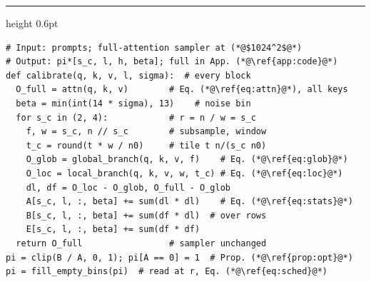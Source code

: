   \begin{minipage}[t]{0.48\linewidth}
    \hrule height 0.6pt\vspace{2pt}
    \label{alg:calib}
    \vspace{-4pt}
\begin{lstlisting}[style=scacode, emph={calibrate,attn,global_branch,local_branch,clip,fill_empty_bins}]
# Input: prompts; full-attention sampler at (*@$1024^2$@*)
# Output: pi*[s_c, l, h, beta]; full in App. (*@\ref{app:code}@*)
def calibrate(q, k, v, l, sigma):  # every block
  O_full = attn(q, k, v)        # Eq. (*@\ref{eq:attn}@*), all keys
  beta = min(int(14 * sigma), 13)    # noise bin
  for s_c in (2, 4):            # r = n / w = s_c
    f, w = s_c, n // s_c        # subsample, window
    t_c = round(t * w / n0)     # tile t n/(s_c n0)
    O_glob = global_branch(q, k, v, f)    # Eq. (*@\ref{eq:glob}@*)
    O_loc = local_branch(q, k, v, w, t_c) # Eq. (*@\ref{eq:loc}@*)
    dl, df = O_loc - O_glob, O_full - O_glob
    A[s_c, l, :, beta] += sum(dl * dl)    # Eq. (*@\ref{eq:stats}@*)
    B[s_c, l, :, beta] += sum(df * dl)  # over rows
    E[s_c, l, :, beta] += sum(df * df)
  return O_full                 # sampler unchanged
pi = clip(B / A, 0, 1); pi[A == 0] = 1  # Prop. (*@\ref{prop:opt}@*)
pi = fill_empty_bins(pi)  # read at r, Eq. (*@\ref{eq:sched}@*)
\end{lstlisting}
  \end{minipage}\hfill
